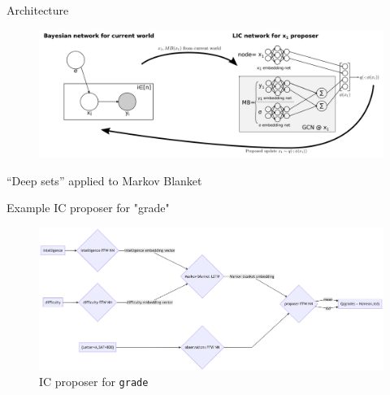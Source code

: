 \begin{subframe}{Architecture}
    \begin{figure}
        \centering
        \includegraphics[width=\textwidth]{Figures/lic/schematic-eg.png}
    \end{figure}
    
    ``Deep sets'' \parencite{zaheer2017deep} applied to Markov Blanket
\end{subframe}


\begin{subframe}[fragile]{Example IC proposer for "grade"}

\begin{figure}
    \centering
    \includegraphics[width=\linewidth]{Figures/lic/ic-grade.png}
    \caption{IC proposer for \texttt{grade}}
\end{figure}

\end{subframe}




